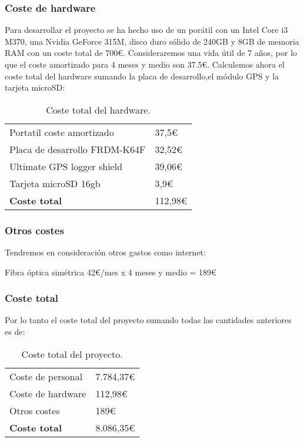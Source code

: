 \subsubsection{Coste de hardware}
Para desarrollar el proyecto se ha hecho uso de un porátil con un Intel Core i3 M370, una Nvidia GeForce 315M, disco duro sólido de 240GB y 8GB de memoria RAM con un coste total de 700\euro . Consideraremos una vida útil de 7 años, por lo que el coste amortizado para 4 meses y medio son 37.5\euro .
Calculemos ahora el coste total del hardware sumando la placa de desarrollo,el módulo GPS y la tarjeta microSD:
\begin{table}[ht!]
\centering
\label{my-label}
\begin{tabular}{ll}
Portatil coste amortizado    				& 37,5\euro  \\
Placa de desarrollo FRDM-K64F \cite{placa} 	& 32,52\euro \\
Ultimate GPS logger shield \cite{gps}      	& 39,06\euro \\ 
Tarjeta microSD 16gb 				     	& 3,9\euro 	 \\ \hline
\textbf{Coste total} 						& 112,98\euro
\end{tabular}
\caption{Coste total del hardware.}
\end{table}

\subsubsection{Otros costes}
Tendremos en consideración otros gastos como internet:

Fibra óptica simétrica 42\euro /mes x 4 meses y medio = 189\euro

\subsubsection{Coste total}
Por lo tanto el coste total del proyecto sumando todas las cantidades anteriores es de:
\begin{table}[ht!]
\centering
\label{my-label}
\begin{tabular}{ll}
Coste de personal    & 7.784,37\euro \\
Coste de hardware    & 112,98\euro   \\
Otros costes         & 189\euro      \\ \hline
\textbf{Coste total} & 8.086,35\euro
\end{tabular}
\caption{Coste total del proyecto.}
\end{table}

